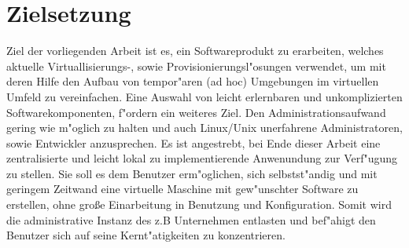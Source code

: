 

\section{Zielsetzung}
Ziel der vorliegenden Arbeit ist es, ein Softwareprodukt zu erarbeiten, welches aktuelle Virtuallisierungs-, sowie Provisionierungsl"osungen verwendet, um mit deren Hilfe den Aufbau von tempor"aren (ad hoc) Umgebungen im virtuellen Umfeld zu vereinfachen.\newline
Eine Auswahl von leicht erlernbaren und unkomplizierten Softwarekomponenten, f"ordern ein weiteres Ziel. Den Administrationsaufwand gering wie m"oglich zu halten und auch Linux/Unix unerfahrene Administratoren, sowie Entwickler anzusprechen.\newline
Es ist angestrebt, bei Ende dieser Arbeit eine zentralisierte und leicht lokal zu implementierende Anwenundung zur Verf"ugung zu stellen.
Sie soll es dem Benutzer erm"oglichen, sich selbstst"andig und mit geringem Zeitwand eine virtuelle Maschine mit gew"unschter Software zu erstellen, ohne gro{\ss}e Einarbeitung in Benutzung und Konfiguration. \newline
Somit wird die administrative Instanz des z.B Unternehmen entlasten und bef"ahigt den Benutzer sich auf seine Kernt"atigkeiten zu konzentrieren.

